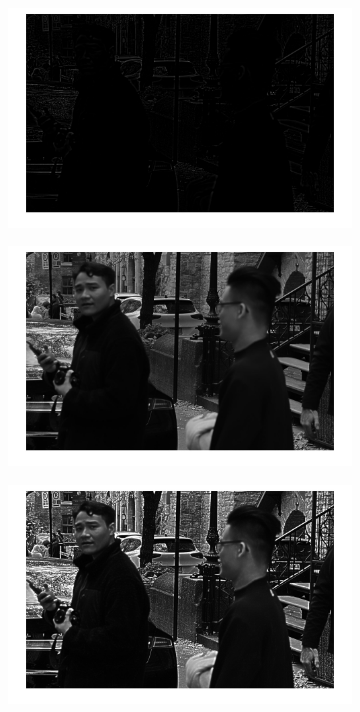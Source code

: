 \documentclass[conference]{IEEEtran}
\begin{document}
\begin{figure}[h!]
\begin{subfigure}[b]{0.3\linewidth}
\caption{}
\end{subfigure}
\begin{subfigure}[b]{0.3\linewidth}
\includegraphics[width=\linewidth]{images/img10.jpg}
\caption{}
\end{subfigure}
\begin{subfigure}[b]{0.3\linewidth}
\includegraphics[width=\linewidth]{images/img11.jpg}
\caption{}
\end{subfigure}
\begin{subfigure}[b]{0.3\linewidth}
\includegraphics[width=\linewidth]{images/img12.jpg}

\end{subfigure}
\end{figure}
\end{document}
